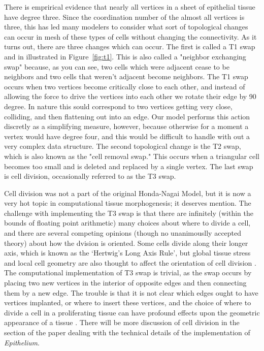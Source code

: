 There is emprirical evidence that nearly all vertices in a sheet of epithelial tissue have degree three. Since the coordination number of the almost all vertices is three, this has led many modelers to consider what sort of topological changes can occur in mesh of these types of cells without changing the connectivity.  As it turns out, there are three changes which can occur.  The first is called a T1 swap and in illustrated in Figure~\ref{fig:t1}. This is also called a "neighbor exchanging swap" because, as you can see, two cells which were adjacent cease to be neighbors and two cells that weren't adjacent become neighbors. The T1 swap occurs when two vertices become critically close to each other, and instead of allowing the force to drive the vertices into each other we rotate their edge by 90 degree. In nature this sould correspond to two vertices getting very close, colliding, and then flattening out into an edge. Our model performs this action discretly as a simplifying measure, however, because otherwise for a moment a vertex would have degree four, and this would be difficult to handle with out a very complex data structure. The second topological change is the T2 swap, which is also known as the "cell removal swap." This occurs when a triangular cell becomes too small and is deleted and replaced by a single vertex. The last swap is cell division, occasionally referred to as the T3 swap. 

Cell division was not a part of the original Honda-Nagai Model, but it is now a very hot topic in computational tissue morphogenesis; it deserves mention. The challenge with implementing the T3 swap is that there are infinitely (within the bounds of floating point arithmetic) many choices about where to divide a cell, and there are several competing opinions (though no unanimouslly accepted theory) about how the dvision is oriented. Some cells divide along their longer axis, which is known as the `Hertwig's Long Axis Rule', but global tissue stress and local cell geometry are also thought to affect the orientation of cell division \cite{Order}\cite{Orientation}. The computational implementation of T3 swap is trivial, as the swap occurs by placing two new vertices in the interior of opposite edges and then connecting them by a new edge. The trouble is that it is not clear which edges ought to have vertices implanted, or where to insert these vertices, and the choice of where to divide a cell in a proliferating tissue can have profound effects upon the geometric appearance of a tissue \cite{Epithelial Topology}. There will be more discussion of cell division in the section of the paper dealing with the technical details of the implementation of \emph{Epithelium}.

